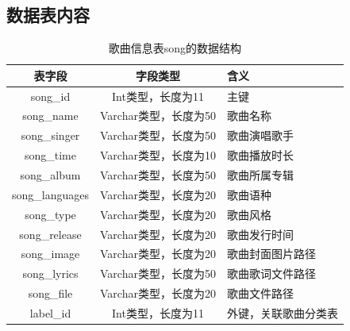\documentclass[UTF8,14pt]{article}
\numberwithin{figure}{subsubsection}
\numberwithin{table}{subsubsection}
\begin{document}
\subsection{数据表内容}
\begin{table}[H]
	\centering
	\setlength{\abovecaptionskip}{0.cm}
	\setlength{\belowcaptionskip}{0.cm}
	\begin{tabular}{|c|c|c|}
		\hline
		\multicolumn{1}{|c|}{表字段}          & \multicolumn{1}{c|}{字段类型}              & \multicolumn{1}{l|}{含义}             \\ \hline
		\multicolumn{1}{|c|}{song\_id}        & \multicolumn{1}{c|}{Int类型，长度为11}     & \multicolumn{1}{l|}{主键}             \\ \hline
		\multicolumn{1}{|c|}{song\_name}      & \multicolumn{1}{c|}{Varchar类型，长度为50} & \multicolumn{1}{l|}{歌曲名称}         \\ \hline
		\multicolumn{1}{|c|}{song\_singer}    & \multicolumn{1}{l|}{Varchar类型，长度为50} & \multicolumn{1}{l|}{歌曲演唱歌手}     \\ \hline
		\multicolumn{1}{|c|}{song\_time}      & \multicolumn{1}{c|}{Varchar类型，长度为10} & \multicolumn{1}{l|}{歌曲播放时长}     \\ \hline
		\multicolumn{1}{|c|}{song\_album}     & \multicolumn{1}{c|}{Varchar类型，长度为50} & \multicolumn{1}{l|}{歌曲所属专辑}     \\ \hline
		\multicolumn{1}{|c|}{song\_languages} & \multicolumn{1}{c|}{Varchar类型，长度为20} & \multicolumn{1}{l|}{歌曲语种}         \\ \hline
		\multicolumn{1}{|c|}{song\_type}      & \multicolumn{1}{c|}{Varchar类型，长度为20} & \multicolumn{1}{l|}{歌曲风格}         \\ \hline
		\multicolumn{1}{|c|}{song\_release}   & \multicolumn{1}{c|}{Varchar类型，长度为20} & \multicolumn{1}{l|}{歌曲发行时间}     \\ \hline
		\multicolumn{1}{|c|}{song\_image}     & \multicolumn{1}{c|}{Varchar类型，长度为20} & \multicolumn{1}{l|}{歌曲封面图片路径} \\ \hline
		\multicolumn{1}{|c|}{song\_lyrics}    & \multicolumn{1}{c|}{Varchar类型，长度为50} & \multicolumn{1}{l|}{歌曲歌词文件路径} \\ \hline
		\multicolumn{1}{|c|}{song\_file}      & \multicolumn{1}{c|}{Varchar类型，长度为20} & \multicolumn{1}{l|}{歌曲文件路径}     \\ \hline
		label\_id                             & Int类型，长度为11                          & 外键，关联歌曲分类表                  \\ \hline
	\end{tabular}
	\caption{歌曲信息表song的数据结构}
\end{table}
\end{document}
